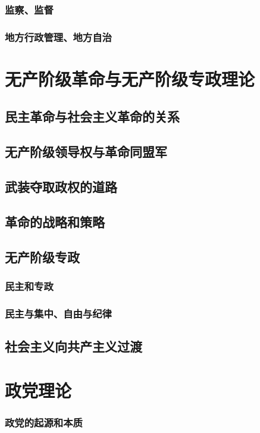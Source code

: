 \documentclass[UTF8]{../RepresentationUniverse}
\begin{document}
    \subsubsection{监察、监督}
    \subsubsection{地方行政管理、地方自治}


\section{无产阶级革命与无产阶级专政理论}
    \subsection{民主革命与社会主义革命的关系}
    \subsection{无产阶级领导权与革命同盟军}
    \subsection{武装夺取政权的道路}
    \subsection{革命的战略和策略}
    \subsection{无产阶级专政}
        \subsubsection{民主和专政}
        \subsubsection{民主与集中、自由与纪律}
    \subsection{社会主义向共产主义过渡}


\section{政党理论}
    \subsubsection{政党的起源和本质}
\end{document}

